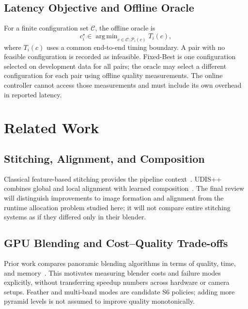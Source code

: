 \documentclass[a4paper,UKenglish,cleveref,autoref,anonymous]{oasics-v2021}
\begin{document}
\subsection{Latency Objective and Offline Oracle}
For a finite configuration set $\mathcal{C}$, the offline oracle is
\begin{equation}
c_i^\star\in\mathop{\mathrm{arg\,min}}_{c\in\mathcal{C}:\mathcal{P}_i(c)}T_i(c),
\label{eq:oracle}
\end{equation}
where $T_i(c)$ uses a common end-to-end timing boundary. A pair with no feasible
configuration is recorded as infeasible. Fixed-Best is one configuration selected
on development data for all pairs; the oracle may select a different configuration
for each pair using offline quality measurements. The online controller cannot
access those measurements and must include its own overhead in reported latency.

\section{Related Work}
\label{sec:related-work}
\subsection{Stitching, Alignment, and Composition}
Classical feature-based stitching provides the pipeline context~\cite{brown2007stitching}.
UDIS++ combines global and local alignment with learned composition~\cite{nie2023udispp}.
The final review will distinguish improvements to image formation and alignment
from the runtime allocation problem studied here; it will not compare entire
stitching systems as if they differed only in their blender.

\subsection{GPU Blending and Cost--Quality Trade-offs}
Prior work compares panoramic blending algorithms in terms of quality, time,
and memory~\cite{zhu2018blending}. This motivates measuring blender costs and
failure modes explicitly, without transferring speedup numbers across hardware
or camera setups. Feather and multi-band modes are candidate S6 policies;
adding more pyramid levels is not assumed to improve quality monotonically.
\end{document}
